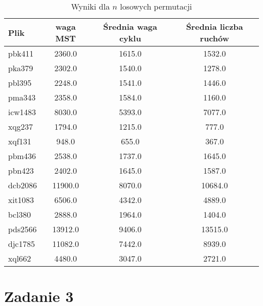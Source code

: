 \documentclass{article}
\begin{document}
\begin{table}[ht]
    \centering
    \begin{tabular}{|l|c|c|c|}
    \hline
    \textbf{Plik} & \textbf{waga MST} & \textbf{Średnia waga cyklu} & \textbf{Średnia liczba ruchów} \\
    \hline
    pbk411 & 2360.0 & 1615.0 & 1532.0 \\
    pka379 & 2302.0 & 1540.0 & 1278.0 \\
    pbl395 & 2248.0 & 1541.0 & 1446.0 \\
    pma343 & 2358.0 & 1584.0 & 1160.0 \\
    icw1483 & 8030.0 & 5393.0 & 7077.0 \\
    xqg237 & 1794.0 & 1215.0 & 777.0 \\
    xqf131 & 948.0 & 655.0 & 367.0 \\
    pbm436 & 2538.0 & 1737.0 & 1645.0 \\
    pbn423 & 2402.0 & 1645.0 & 1587.0 \\
    dcb2086 & 11900.0 & 8070.0 & 10684.0 \\
    xit1083 & 6506.0 & 4342.0 & 4889.0 \\
    bcl380 & 2888.0 & 1964.0 & 1404.0 \\
    pds2566 & 13912.0 & 9406.0 & 13515.0 \\
    djc1785 & 11082.0 & 7442.0 & 8939.0 \\
    xql662 & 4480.0 & 3047.0 & 2721.0 \\
    \hline
    \end{tabular}
    \caption{Wyniki dla $n$ losowych permutacji}
\end{table}
    
\section*{Zadanie 3}
\end{document}

